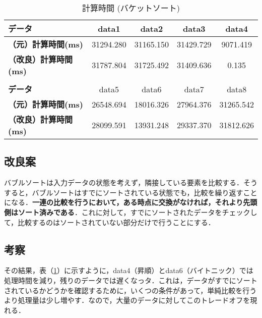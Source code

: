 \documentclass[a4j, titlepage]{jarticle}
\begin{document}
            \begin{table}[tbh]
                \caption{計算時間 (バケットソート)}
                \label{tab:bubble}
                \begin{center}
                    \begin{tabular}{lcccc}
                        \hline
                        \textbf{データ} & data1 & data2 &data3 &data4 \\ \hline
                        \textbf{（元）計算時間(ms)} & 31294.280 & 31165.150 & 31429.729 & \cellcolor{green!20}9071.419\\ \hline
                        \textbf{（改良）計算時間(ms)} & 31787.804 & 31725.492 & 31409.636 & \cellcolor{green!20}0.135\\ \hline
                        \\ \hline
                        \textbf{データ} & data5 &data6 &data7 &data8\\ \hline
                        \textbf{（元）計算時間(ms)} & 26548.694 & \cellcolor{green!20}18016.326 & 27964.376 & 31265.542\\ \hline
                        \textbf{（改良）計算時間(ms)} & 28099.591 & \cellcolor{green!20}13931.248 & 29337.370 & 31812.626\\ \hline
                    \end{tabular}
                \end{center}
            \end{table}
        
        \subsection{改良案}
            バブルソートは入力データの状態を考えず，隣接している要素を比較する．そうすると，バブルソートはすでにソートされている状態でも，比較を繰り返すことになる．\textbf{一連の比較を行うにおいて，ある時点に交換がなければ，それより先頭側はソート済みである}\cite{cite:boyoh}．これに対して，すでにソートされたデータをチェックして，比較するのはソートされていない部分だけで行うことにする．
        
        \subsection{考察}
            その結果，表（\ref{tab:bubble}）に示すように，data4（昇順）とdata6（バイトニック）では処理時間を減り，残りのデータでは遅くなっタ．これは，データがすでにソートされているかどうかを確認するために，いくつの条件があって，単純比較を行うより処理量は少し増やす．なので，大量のデータに対してこのトレードオフを現れる．
\end{document}

